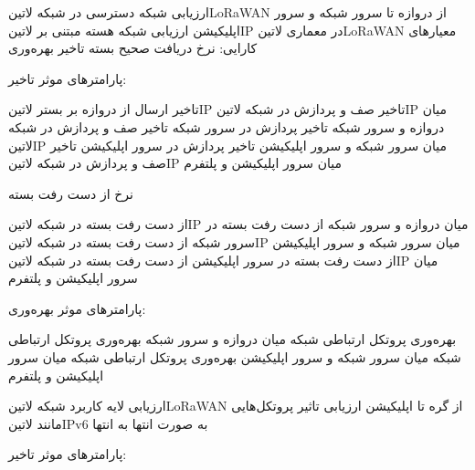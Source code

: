 \documentclass[dvipsnames]{beamer}
\begin{document}
\begin{persian}

	\begin{frame}{ارزیابی شبکه دسترسی در شبکه ‌لاتین{LoRaWAN} از دروازه تا سرور شبکه و سرور اپلیکیشن}
		 ارزیابی شبکه هسته مبتنی بر ‌لاتین{IP} در معماری ‌لاتین{LoRaWAN}
		 معیارهای کارایی:
		 نرخ دریافت صحیح بسته
		 تاخیر
		 بهره‌وری
	\end{frame}

	\begin{frame}{پارامترهای موثر}
	   تاخیر:

	   تاخیر ارسال از دروازه بر بستر ‌لاتین{IP}
	   تاخیر صف و پردازش در شبکه ‌لاتین{IP} میان دروازه و سرور شبکه
	   تاخیر پردازش در سرور شبکه
	   تاخیر صف و پردازش در شبکه ‌لاتین{IP} میان سرور شبکه و سرور اپلیکیشن
	   تاخیر پردازش در سرور اپلیکیشن
	   تاخیر صف و پردازش در شبکه ‌لاتین{IP} میان سرور اپلیکیشن و پلتفرم

	  نرخ از دست رفت بسته

	   از دست رفت بسته در شبکه ‌لاتین{IP} میان دروازه و سرور شبکه
	   از دست رفت بسته در سرور شبکه
	   از دست رفت بسته در شبکه ‌لاتین{IP} میان سرور شبکه و سرور اپلیکیشن
	   از دست رفت بسته در سرور اپلیکیشن
	   از دست رفت بسته در شبکه ‌لاتین{IP} میان سرور اپلیکیشن و پلتفرم

	\end{frame}

	\begin{frame}{پارامترهای موثر}
	   بهره‌وری:

	   بهره‌وری پروتکل ارتباطی شبکه میان دروازه و سرور شبکه
	   بهره‌وری پروتکل ارتباطی شبکه میان سرور شبکه و سرور اپلیکیشن
	   بهره‌وری پروتکل ارتباطی شبکه میان سرور اپلیکیشن و پلتفرم

	\end{frame}

	\begin{frame}{ارزیابی لایه کاربرد شبکه ‌لاتین{LoRaWAN} از گره تا اپلیکیشن}
	   ارزیابی تاثیر پروتکل‌هایی مانند ‌لاتین{IPv6} به صورت انتها به انتها
	\end{frame}

	\begin{frame}{پارامترهای موثر}
	   تاخیر:


\end{frame}
\end{persian}
\end{document}
